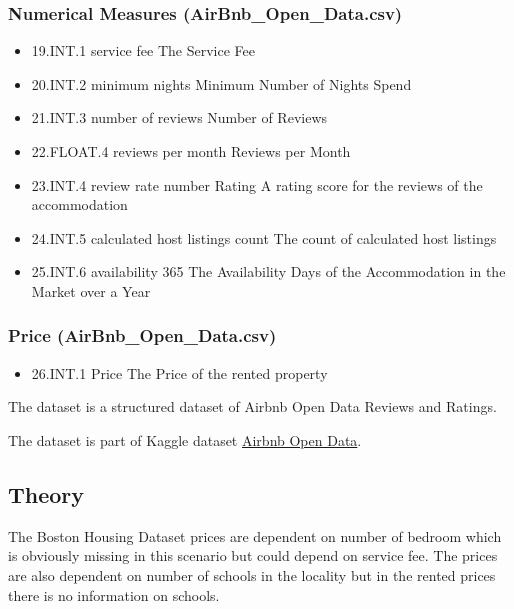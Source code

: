 \documentclass[11pt]{article}
\providecommand{\tightlist}{%
      \setlength{\itemsep}{0pt}\setlength{\parskip}{0pt}}
\begin{document}
\hypertarget{numerical-measures-airbnb_open_data.csv}{%
\subsubsection{Numerical Measures
(AirBnb\_Open\_Data.csv)}\label{numerical-measures-airbnb_open_data.csv}}

\begin{itemize}
\tightlist
\item
  19.INT.1 service fee The Service Fee
\item
  20.INT.2 minimum nights Minimum Number of Nights Spend
\item
  21.INT.3 number of reviews Number of Reviews
\item
  22.FLOAT.4 reviews per month Reviews per Month
\item
  23.INT.4 review rate number Rating A rating score for the reviews of
  the accommodation
\item
  24.INT.5 calculated host listings count The count of calculated host
  listings
\item
  25.INT.6 availability 365 The Availability Days of the Accommodation
  in the Market over a Year
\end{itemize}

\hypertarget{price-airbnb_open_data.csv}{%
\subsubsection{Price
(AirBnb\_Open\_Data.csv)}\label{price-airbnb_open_data.csv}}

\begin{itemize}
\tightlist
\item
  26.INT.1 Price The Price of the rented property
\end{itemize}

The dataset is a structured dataset of Airbnb Open Data Reviews and
Ratings.

The dataset is part of Kaggle dataset
\href{https://www.kaggle.com/datasets/arianazmoudeh/airbnbopendata/data}{Airbnb
Open Data}.

    \hypertarget{theory}{%
\subsection{Theory}\label{theory}}

The Boston Housing Dataset prices are dependent on number of bedroom
which is obviously missing in this scenario but could depend on service
fee. The prices are also dependent on number of schools in the locality
but in the rented prices there is no information on schools.
\end{document}
